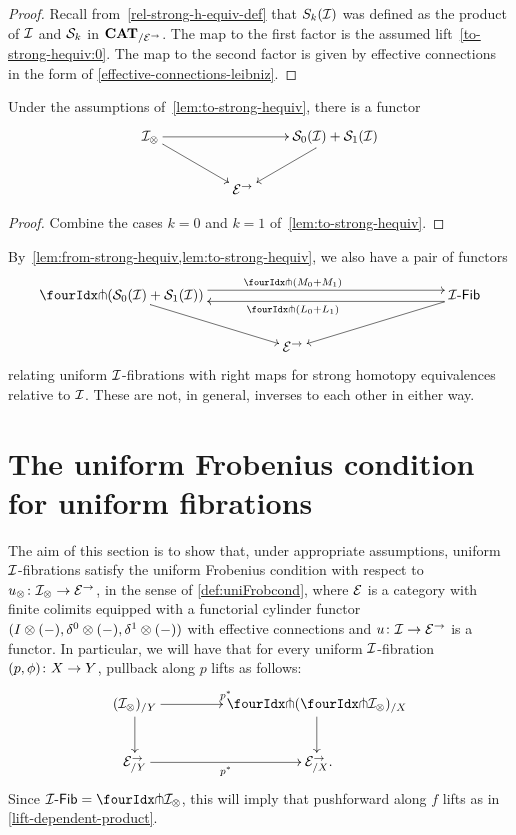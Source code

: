 \documentclass[reqno,10pt,a4paper,oneside,draft]{amsart}
\begin{document}
\begin{proof}
Recall from~\eqref{rel-strong-h-equiv-def} that $S_k(\cal{I})$ was defined as the product of $\cal{I}$ and $\cal{S}_k$ in $\CAT_{/\cal{E}^\to}$.
The map to the first factor is the assumed lift~\eqref{to-strong-hequiv:0}.
The map to the second factor is given by effective connections in the form of \cref{effective-connections-leibniz}.
\end{proof}


\begin{proposition} \label{thm:twodir}
Under the assumptions of~\cref{lem:to-strong-hequiv}, there is a functor 
\[
\xymatrix@!C@C-2.5em{
    \cal{I}_\otimes
  \ar[dr]
  \ar[rr]
&&
\cal{S}_0(\cal{I}) + \cal{S}_1(\cal{I})
  \ar[dl]
\\&
  \catE^\to
}
\]
\end{proposition} 

\begin{proof} Combine the cases $k = 0$ and $k = 1$ of~\cref{lem:to-strong-hequiv}.
\end{proof} 

\begin{remark} \label{relating-strong-hequiv-and-uniform-fib}
By~\cref{lem:from-strong-hequiv,lem:to-strong-hequiv},
we also have a pair of functors
\[
\xymatrix@!C@C-2.5em{
  \liftr{(\cal{S}_0(\cal{I}) + \cal{S}_1(\cal{I}))}
  \ar[dr]
  \ar@<4pt>[rr]^{\liftr{(M_0 + M_1)}}
&&
  \Fib{\cal{I}}
  \ar[dl]
  \ar@<4pt>[ll]^{\liftr{(L_0 + L_1)}}
\\&
  \catE^\to
}
\]
relating uniform $\cal{I}$-fibrations with right maps for strong homotopy equivalences relative to $\cal{I}$. These are not, in general, inverses to each other in either way.
\end{remark}


\section{The uniform Frobenius condition for uniform fibrations}
\label{sec:frocuf}

The aim of this section is to show that, under appropriate assumptions, uniform $\cal{I}$-fibrations satisfy the uniform Frobenius condition with respect to $u_\otimes \co \cal{I}_\otimes \to \cal{E}^\to$, in the sense of \cref{def:uniFrobcond}, where $\catE$ is a category with finite colimits equipped with a functorial cylinder functor $(\interval \otimes (-), \lcyl \otimes (-), \rcyl \otimes (-))$ with effective connections and  $u \co \cal{I} \to \catE^\to$ is a functor.
In particular, we will have that for every uniform $\cal{I}$-fibration $(p, \phi) \co X \to Y$, pullback along $p$ lifts as follows:
\[
\xymatrix@C+2em{
  (\cal{I}_\otimes)_{/Y}
  \ar[r]^{p^*}
  \ar[d]
&
  \liftl{(\liftr{\cal{I}_\otimes})}_{/X}
  \ar[d]
\\
  \cal{E}^\to_{/Y}
  \ar[r]_{p^*}
&
  \cal{E}^\to_{/X}
\rlap{.}}
\]
Since $\Fib{\cal{I}}  = \liftr{\cal{I}_\otimes}$, this will imply that pushforward along $f$ lifts as in \cref{lift-dependent-product}.
\end{document}
